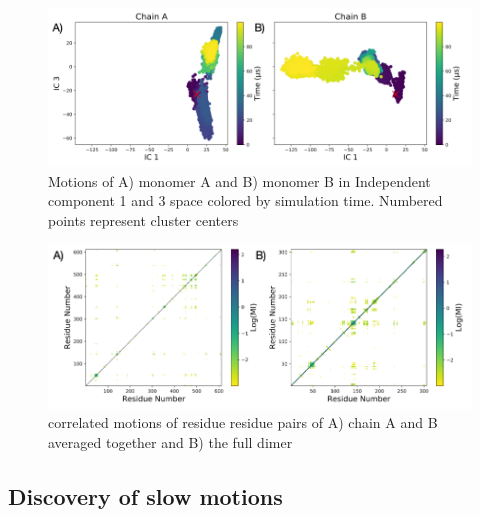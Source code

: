 \documentclass{biophys-new}
\begin{document}
\begin{figure}[hbt!]
\centering
\includegraphics[width=0.6\linewidth]{figures/fig_4_fdiscolortime_ic3_label.png}
\caption{Motions of A) monomer A and B) monomer B in Independent component 1 and 3 space colored by simulation time. Numbered points represent cluster centers}
\label{fig:view}
\end{figure}

\begin{figure}[hbt!]
\centering
\includegraphics[width=0.6\linewidth]{figures/MI_full_and_average.png}
\caption{correlated motions of residue residue pairs of A) chain A and B averaged together and B) the full dimer }
\label{fig:view}
\end{figure}

\subsection*{Discovery of slow motions}
\end{document}

